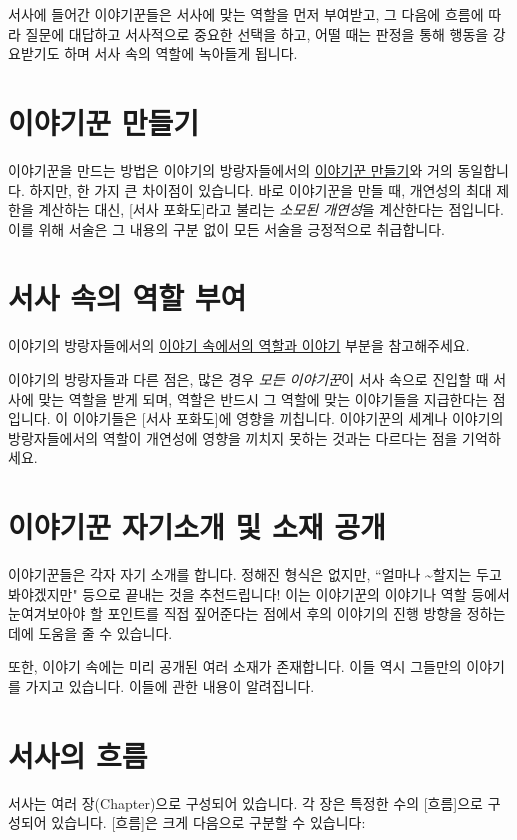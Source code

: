 \documentclass{report}
\begin{document}
	서사에 들어간 이야기꾼들은 서사에 맞는 역할을 먼저 부여받고, 그 다음에 흐름에 따라 질문에 대답하고 서사적으로 중요한 선택을 하고, 어떨 때는 판정을 통해 행동을 강요받기도 하며 서사 속의 역할에 녹아들게 됩니다.
	
	\section{이야기꾼 만들기}
		이야기꾼을 만드는 방법은 이야기의 방랑자들에서의 \hyperlink{lite-character-creation}{이야기꾼 만들기}와 거의 동일합니다. 하지만, 한 가지 큰 차이점이 있습니다. 바로 이야기꾼을 만들 때, 개연성의 최대 제한을 계산하는 대신, [서사 포화도]라고 불리는 \emph{소모된 개연성}을 계산한다는 점입니다. 이를 위해 서술은 그 내용의 구분 없이 모든 서술을 긍정적으로 취급합니다.
	
	\section{서사 속의 역할 부여}
		이야기의 방랑자들에서의 \hyperlink{lite-roles}{이야기 속에서의 역할과 이야기} 부분을 참고해주세요.
		
		이야기의 방랑자들과 다른 점은, 많은 경우 \emph{모든 이야기꾼}이 서사 속으로 진입할 때 서사에 맞는 역할을 받게 되며, 역할은 반드시 그 역할에 맞는 이야기들을 지급한다는 점입니다. 이 이야기들은 [서사 포화도]에 영향을 끼칩니다. 이야기꾼의 세계나 이야기의 방랑자들에서의 역할이 개연성에 영향을 끼치지 못하는 것과는 다르다는 점을 기억하세요.
	
	\section{이야기꾼 자기소개 및 소재 공개}
		이야기꾼들은 각자 자기 소개를 합니다. 정해진 형식은 없지만, ``얼마나 \textasciitilde 할지는 두고봐야겠지만" 등으로 끝내는 것을 추천드립니다! 이는 이야기꾼의 이야기나 역할 등에서 눈여겨보아야 할 포인트를 직접 짚어준다는 점에서 후의 이야기의 진행 방향을 정하는 데에 도움을 줄 수 있습니다.
		
		또한, 이야기 속에는 미리 공개된 여러 소재가 존재합니다. 이들 역시 그들만의 이야기를 가지고 있습니다. 이들에 관한 내용이 알려집니다.
		
	\section{서사의 흐름}
		서사는 여러 장(Chapter)으로 구성되어 있습니다. 각 장은 특정한 수의 [흐름]으로 구성되어 있습니다. [흐름]은 크게 다음으로 구분할 수 있습니다:
		
\end{document}
